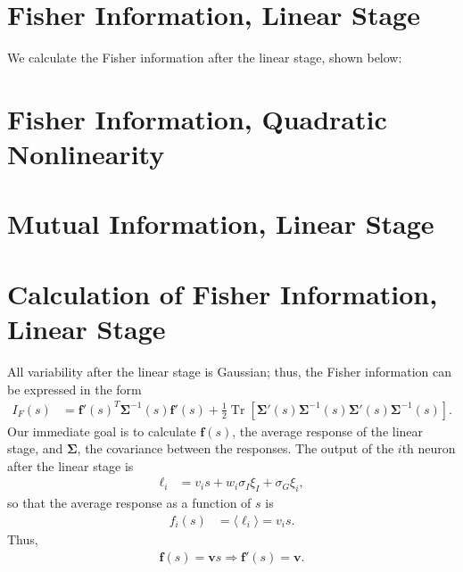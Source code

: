 \documentclass[11pt]{article}
\DeclareMathOperator{\Tr}{Tr}
\begin{document}
	\section{Fisher Information, Linear Stage}
	We calculate the Fisher information after the linear stage, shown below:
	\begin{figure}[H]
		\centering
	\end{figure}
	
	\newpage
	\section{Fisher Information, Quadratic Nonlinearity}
	
	\newpage
	\section{Mutual Information, Linear Stage}
	\begin{figure}[H]
	\centering
	\end{figure}
	
	
	\appendix
	\newpage
	\section{Calculation of  Fisher Information, Linear Stage}
	All variability after the linear stage is Gaussian; thus, the Fisher information can be expressed in the form
	\begin{align}
		I_{F}(s) &= \mathbf{f}'(s)^T \boldsymbol{\Sigma}^{-1} (s) \mathbf{f}'(s) + \frac{1}{2}\Tr\left[\boldsymbol{\Sigma}'(s) \boldsymbol{\Sigma}^{-1}(s)\boldsymbol{\Sigma}'(s) \boldsymbol{\Sigma}^{-1}(s)\right]. \label{IF-gaussian}
	\end{align}
	Our immediate goal is to calculate $\mathbf{f}(s)$, the average response of the linear stage, and $\boldsymbol{\Sigma}$, the covariance between the responses. The output of the $i$th neuron after the linear stage is
	\begin{align}
		\ell_i &= v_i s + w_i \sigma_I \xi_I + \sigma_G\xi_i,
	\end{align}
	so that the average response as a function of $s$ is
	\begin{align}
		f_i(s) &= \langle \ell_i \rangle = v_i s.
	\end{align}
	Thus,
	\begin{align}
		\mathbf{f}(s) = \mathbf{v}s \Rightarrow \mathbf{f}'(s) = \mathbf{v}.
	\end{align}
	
\end{document}
